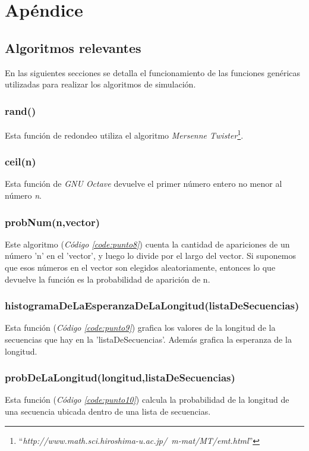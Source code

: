 \documentclass{article}
\newcommand{\refcode}[1]{\textit{Código \ref{#1}}}
\begin{document}
\section{Apéndice}


\subsection{Algoritmos relevantes}

En las siguientes secciones se detalla el funcionamiento de las funciones genéricas utilizadas para realizar los algoritmos de simulación.


\subsubsection{rand()}

Esta función de redondeo utiliza el algoritmo \textit{Mersenne Twister}\footnote{``\textit{http://www.math.sci.hiroshima-u.ac.jp/~m-mat/MT/emt.html}''}.


\subsubsection{ceil(n)}

Esta función de \textit{GNU Octave} devuelve el primer número entero no menor al número \textit{n}.


\subsubsection{probNum(n,vector)}

Este algoritmo (\refcode{code:punto8}) cuenta la cantidad de apariciones de un número 'n' en el 'vector', y luego lo divide por el largo del vector. Si suponemos que esos números en el vector son elegidos aleatoriamente, entonces lo que devuelve la función es la probabilidad de aparición de n.




\subsubsection{histogramaDeLaEsperanzaDeLaLongitud(listaDeSecuencias)}

Esta función (\refcode{code:punto9}) grafica los valores de la longitud de la secuencias que hay en la 'listaDeSecuencias'. Además grafica la esperanza de la longitud.




\subsubsection{probDeLaLongitud(longitud,listaDeSecuencias)}

Esta función (\refcode{code:punto10}) calcula la probabilidad de la longitud de una secuencia ubicada dentro de una lista de secuencias.


\bigskip
\end{document}
